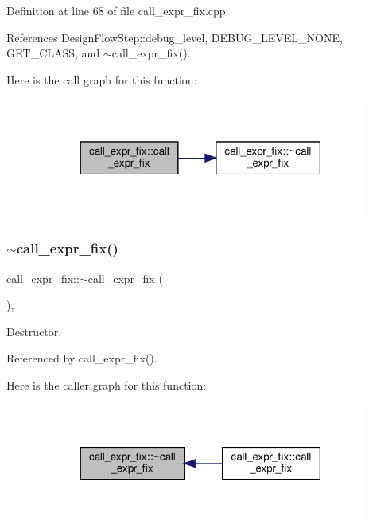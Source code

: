 Definition at line 68 of file call\+\_\+expr\+\_\+fix.\+cpp.



References Design\+Flow\+Step\+::debug\+\_\+level, D\+E\+B\+U\+G\+\_\+\+L\+E\+V\+E\+L\+\_\+\+N\+O\+NE, G\+E\+T\+\_\+\+C\+L\+A\+SS, and $\sim$call\+\_\+expr\+\_\+fix().

Here is the call graph for this function\+:
\nopagebreak
\begin{figure}[H]
\begin{center}
\leavevmode
\includegraphics[width=306pt]{dc/d11/classcall__expr__fix_a594e31d69f9195fe9a8c309c671c812a_cgraph}
\end{center}
\end{figure}
\mbox{\label{classcall__expr__fix_afab1acad9ea02275ec326ad5a1a920fd}} 
\subsubsection{\texorpdfstring{$\sim$call\+\_\+expr\+\_\+fix()}{~call\_expr\_fix()}}
{\footnotesize\ttfamily call\+\_\+expr\+\_\+fix\+::$\sim$call\+\_\+expr\+\_\+fix (\begin{DoxyParamCaption}{ }\end{DoxyParamCaption})\hspace{0.3cm}{\ttfamily [override]}, {\ttfamily [default]}}



Destructor. 



Referenced by call\+\_\+expr\+\_\+fix().

Here is the caller graph for this function\+:
\nopagebreak
\begin{figure}[H]
\begin{center}
\leavevmode
\includegraphics[width=306pt]{dc/d11/classcall__expr__fix_afab1acad9ea02275ec326ad5a1a920fd_icgraph}
\end{center}
\end{figure}


